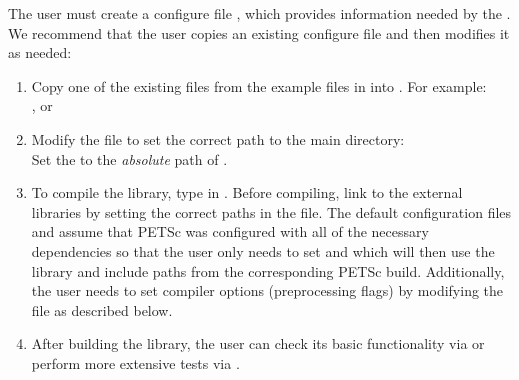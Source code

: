 The user must create a configure file , which provides information needed by the . We recommend that the user copies an existing configure file and then modifies it as needed:
\begin{enumerate}
	\itemsep 0pt
	\item{
		Copy one of the existing  files from the example files in  into . For example:\\ 
		, or\\
	} \item{
		Modify the  file to set the correct path to the main directory:\\ 
		Set the  to the \emph{absolute} path of .
	} \item{
		To compile the library, type  in . Before compiling, link to the external libraries by setting the correct paths in the  file. The default configuration files  and  assume that PETSc was configured with all of the necessary dependencies so that the user only needs to set  and  which will then use the library and include paths from the corresponding PETSc build. Additionally, the user needs to set compiler options (preprocessing flags) by modifying the  file as described below.
	} \item{
		After building the library, the user can check its basic functionality via  or perform more extensive tests via .
	}
\end{enumerate}

